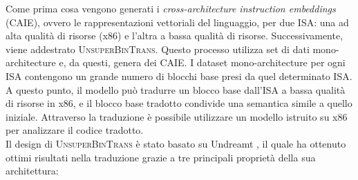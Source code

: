 \documentclass[12pt,a4paper,openright,twoside]{report}
\begin{document}
\noindent Come prima cosa vengono generati i \textit{cross-architecture instruction embeddings} (CAIE), ovvero le rappresentazioni vettoriali del linguaggio, per due ISA: una ad alta qualità di risorse (x86) e l'altra  a bassa qualità di risorse. Successivamente, viene addestrato \textsc{UnsuperBinTrans}. Questo processo utilizza set di dati mono-architecture e, da questi, genera dei CAIE. I dataset mono-architecture per ogni ISA contengono un grande numero di blocchi base presi da quel determinato ISA.\\
A questo punto, il modello può tradurre un blocco base dall'ISA a bassa qualità di risorse in x86, e il blocco base tradotto condivide una semantica simile a quello iniziale. Attraverso la traduzione è possibile utilizzare un modello istruito su x86 per analizzare il codice tradotto.\\
Il design di \textsc{UnsuperBinTrans} è stato basato su Undreamt \cite{Undreamt}, il quale ha ottenuto ottimi risultati nella traduzione grazie a tre principali proprietà della sua architettura: 
\end{document}
